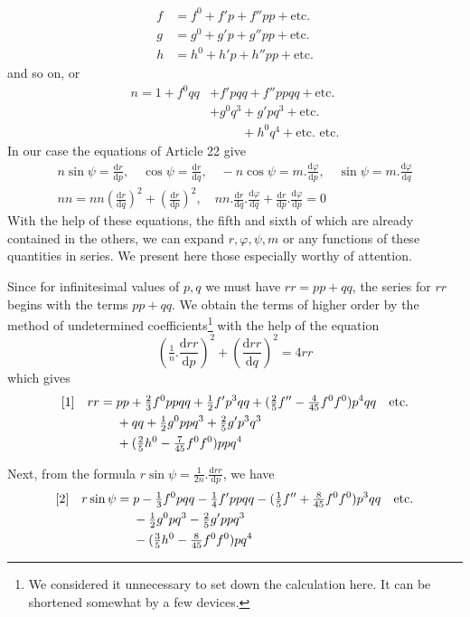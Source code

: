 %
\[
\begin{aligned}
f&=f^0+f'p+f''pp+\text{etc.}\\
g&=g^0+g'p+g''pp+\text{etc.}\\
h&=h^0+h'p+h''pp+\text{etc.}
\end{aligned}
\]
and so on, or
\[
\begin{aligned}
n=1+f^0qq&+f'pqq+f''ppqq+\text{etc.}\\
&+g^0q^3+g'pq^3+\text{etc.}\\
&\phantom{+g^0q^3}+h^0q^4+\text{etc. etc.}
\end{aligned}
\]
In our case the equations of Article 22 give
\[
\begin{gathered}
n\sin\psi=\frac{\mathrm{d}r}{\mathrm{d}p},\quad\cos\psi=\frac{\mathrm{d}r}{\mathrm{d}q},\quad-n\cos\psi=m\mathord{.}\frac{\mathrm{d}\varphi}{\mathrm{d}p},\quad\sin\psi=m\mathord{.}\frac{\mathrm{d}\varphi}{\mathrm{d}q}\\
nn=nn(\frac{\mathrm{d}r}{\mathrm{d}q})^2+(\frac{\mathrm{d}r}{\mathrm{d}p})^2,\quad nn\mathord{.}\frac{\mathrm{d}r}{\mathrm{d}q}\mathord{.}\frac{\mathrm{d}\varphi}{\mathrm{d}q}+\frac{\mathrm{d}r}{\mathrm{d}p}\mathord{.}\frac{\mathrm{d}\varphi}{\mathrm{d}p}=0
\end{gathered}
\]
With the help of these equations, the fifth and sixth of which are already contained in the others, we can expand \(r,\varphi,\psi,m\) or any functions of these quantities in series. We present here those especially worthy of attention.

Since for infinitesimal values of \(p,q\) we must have \(rr=pp+qq\), the series for \(rr\) begins with the terms \(pp+qq\). We obtain the terms of higher order by the method of undetermined coefficients\footnote{We considered it unnecessary to set down the calculation here. It can be shortened somewhat by a few devices.} with the help of the equation
\[
(\tfrac{1}{n}\mathord{.}\frac{\mathrm{d}rr}{\mathrm{d}p})^2+(\frac{\mathrm{d}rr}{\mathrm{d}q})^2=4rr
\]
which gives
\[
\begin{aligned}
\relax[1]\quad rr={}&pp+\tfrac{2}{3}f^0ppqq+\tfrac{1}{2}f'p^3qq+(\tfrac{2}{5}f''-\tfrac{4}{45}f^0f^0)p^4qq\quad\text{etc.}\\
&+qq+\tfrac{1}{2}g^0ppq^3+\tfrac{2}{5}g'p^3q^3\\
&+(\tfrac{2}{5}h^0-\tfrac{7}{45}f^0f^0)ppq^4
\end{aligned}
\]

Next, from the formula \(r\sin\psi=\frac{1}{2n}\mathord{.}\frac{\mathrm{d}rr}{\mathrm{d}p}\), we have
\[
\begin{aligned}
\relax[2]\quad r\sin\psi={}&p-\tfrac{1}{3}f^0pqq-\tfrac{1}{4}f'ppqq-(\tfrac{1}{5}f''+\tfrac{8}{45}f^0f^0)p^3qq\quad\text{etc.}\\
&-\tfrac{1}{2}g^0pq^3-\tfrac{2}{5}g'ppq^3\\
&-(\tfrac{3}{5}h^0-\tfrac{8}{45}f^0f^0)pq^4
\end{aligned}
\]
